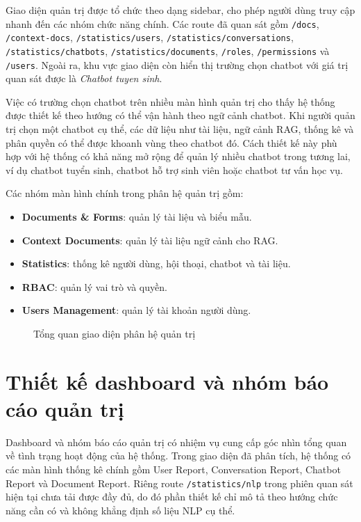 \documentclass[12pt,a4paper]{report}
\begin{document}
Giao diện quản trị được tổ chức theo dạng sidebar, cho phép người dùng truy cập nhanh đến các nhóm chức năng chính. Các route đã quan sát gồm \texttt{/docs}, \texttt{/context-docs}, \texttt{/statistics/users}, \texttt{/statistics/conversations}, \texttt{/statistics/chatbots}, \texttt{/statistics/documents}, \texttt{/roles}, \texttt{/permissions} và \texttt{/users}. Ngoài ra, khu vực giao diện còn hiển thị trường chọn chatbot với giá trị quan sát được là \textit{Chatbot tuyen sinh}.

Việc có trường chọn chatbot trên nhiều màn hình quản trị cho thấy hệ thống được thiết kế theo hướng có thể vận hành theo ngữ cảnh chatbot. Khi người quản trị chọn một chatbot cụ thể, các dữ liệu như tài liệu, ngữ cảnh RAG, thống kê và phân quyền có thể được khoanh vùng theo chatbot đó. Cách thiết kế này phù hợp với hệ thống có khả năng mở rộng để quản lý nhiều chatbot trong tương lai, ví dụ chatbot tuyển sinh, chatbot hỗ trợ sinh viên hoặc chatbot tư vấn học vụ.

Các nhóm màn hình chính trong phân hệ quản trị gồm:

\begin{itemize}
    \item \textbf{Documents \& Forms}: quản lý tài liệu và biểu mẫu.
    \item \textbf{Context Documents}: quản lý tài liệu ngữ cảnh cho RAG.
    \item \textbf{Statistics}: thống kê người dùng, hội thoại, chatbot và tài liệu.
    \item \textbf{RBAC}: quản lý vai trò và quyền.
    \item \textbf{Users Management}: quản lý tài khoản người dùng.
\end{itemize}

\begin{figure}[H]
    \centering
    \caption{Tổng quan giao diện phân hệ quản trị}
    \label{fig:admin-overview}
\end{figure}

\section{Thiết kế dashboard và nhóm báo cáo quản trị}

Dashboard và nhóm báo cáo quản trị có nhiệm vụ cung cấp góc nhìn tổng quan về tình trạng hoạt động của hệ thống. Trong giao diện đã phân tích, hệ thống có các màn hình thống kê chính gồm User Report, Conversation Report, Chatbot Report và Document Report. Riêng route \texttt{/statistics/nlp} trong phiên quan sát hiện tại chưa tải được đầy đủ, do đó phần thiết kế chỉ mô tả theo hướng chức năng cần có và không khẳng định số liệu NLP cụ thể.
\end{document}
